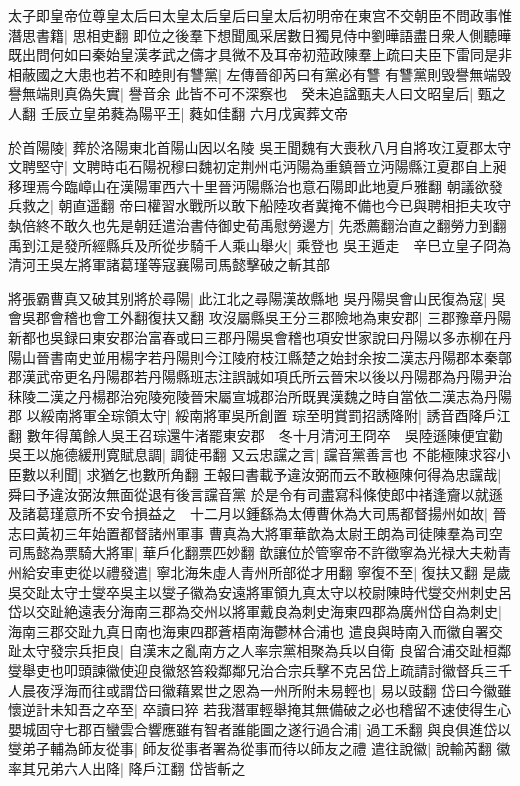 太子即皇帝位尊皇太后曰太皇太后皇后曰皇太后初明帝在東宫不交朝臣不問政事惟潛思書籍|{
	思相吏翻}
即位之後羣下想聞風采居數日獨見侍中劉曄語盡日衆人側聽曄既出問何如曰秦始皇漢孝武之儔才具微不及耳帝初蒞政陳羣上疏曰夫臣下雷同是非相蔽國之大患也若不和睦則有讐黨|{
	左傳晉卻芮曰有黨必有讐}
有讐黨則毁譽無端毁譽無端則真偽失實|{
	譽音余}
此皆不可不深察也　癸未追諡甄夫人曰文昭皇后|{
	甄之人翻}
壬辰立皇弟蕤為陽平王|{
	蕤如佳翻}
六月戊寅葬文帝

於首陽陵|{
	葬於洛陽東北首陽山因以名陵}
吳王聞魏有大喪秋八月自將攻江夏郡太守文聘堅守|{
	文聘時屯石陽祝穆曰魏初定荆州屯沔陽為重鎮晉立沔陽縣江夏郡自上昶移理焉今臨嶂山在漢陽軍西六十里晉沔陽縣治也意石陽即此地夏戶雅翻}
朝議欲發兵救之|{
	朝直遥翻}
帝曰權習水戰所以敢下船陸攻者冀掩不備也今已與聘相拒夫攻守埶倍終不敢久也先是朝廷遣治書侍御史荀禹慰勞邊方|{
	先悉薦翻治直之翻勞力到翻}
禹到江是發所經縣兵及所從步騎千人乘山舉火|{
	乘登也}
吳王遁走　辛巳立皇子冏為清河王吳左將軍諸葛瑾等寇襄陽司馬懿擊破之斬其部

將張霸曹真又破其别將於尋陽|{
	此江北之尋陽漢故縣地}
吳丹陽吳會山民復為寇|{
	吳會吳郡會稽也會工外翻復扶又翻}
攻沒屬縣吳王分三郡險地為東安郡|{
	三郡豫章丹陽新都也吳録曰東安郡治富春或曰三郡丹陽吳會稽也項安世家說曰丹陽以多赤柳在丹陽山晉書南史並用楊字若丹陽則今江陵府枝江縣楚之始封余按二漢志丹陽郡本秦鄣郡漢武帝更名丹陽郡若丹陽縣班志注誤誠如項氏所云晉宋以後以丹陽郡為丹陽尹治秣陵二漢之丹楊郡治宛陵宛陵晉宋屬宣城郡治所既異漢魏之時自當依二漢志為丹陽郡}
以綏南將軍全琮領太守|{
	綏南將軍吳所創置}
琮至明賞罰招誘降附|{
	誘音酉降戶江翻}
數年得萬餘人吳王召琮還牛渚罷東安郡　冬十月清河王冏卒　吳陸遜陳便宜勸吳王以施德緩刑寛賦息調|{
	調徒弔翻}
又云忠讜之言|{
	讜音黨善言也}
不能極陳求容小臣數以利聞|{
	求猶乞也數所角翻}
王報曰書載予違汝弼而云不敢極陳何得為忠讜哉|{
	舜曰予違汝弼汝無面從退有後言讜音黨}
於是令有司盡寫科條使郎中禇逢齎以就遜及諸葛瑾意所不安令損益之　十二月以鍾繇為太傅曹休為大司馬都督揚州如故|{
	晉志曰黃初三年始置都督諸州軍事}
曹真為大將軍華歆為太尉王朗為司徒陳羣為司空司馬懿為票騎大將軍|{
	華戶化翻票匹妙翻}
歆讓位於管寧帝不許徵寧為光禄大夫勑青州給安車吏從以禮發遣|{
	寧北海朱虛人青州所部從才用翻}
寧復不至|{
	復扶又翻}
是歲吳交趾太守士燮卒吳主以燮子徽為安遠將軍領九真太守以校尉陳時代燮交州刺史呂岱以交趾絶遠表分海南三郡為交州以將軍戴良為刺史海東四郡為廣州岱自為刺史|{
	海南三郡交趾九真日南也海東四郡蒼梧南海鬱林合浦也}
遣良與時南入而徽自署交趾太守發宗兵拒良|{
	自漢末之亂南方之人率宗黨相聚為兵以自衛}
良留合浦交趾桓鄰燮舉吏也叩頭諫徽使迎良徽怒笞殺鄰鄰兄治合宗兵擊不克呂岱上疏請討徽督兵三千人晨夜浮海而往或謂岱曰徽藉累世之恩為一州所附未易輕也|{
	易以豉翻}
岱曰今徽雖懷逆計未知吾之卒至|{
	卒讀曰猝}
若我潛軍輕舉掩其無備破之必也稽留不速使得生心嬰城固守七郡百蠻雲合響應雖有智者誰能圖之遂行過合浦|{
	過工禾翻}
與良俱進岱以燮弟子輔為師友從事|{
	師友從事者署為從事而待以師友之禮}
遣往說徽|{
	說輸芮翻}
徽率其兄弟六人出降|{
	降戶江翻}
岱皆斬之

